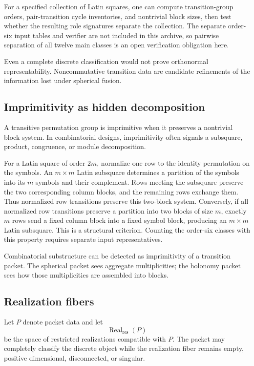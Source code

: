 \begin{skeletonbox}
For a specified collection of Latin squares, one can compute transition-group orders, pair-transition cycle inventories, and nontrivial block sizes, then test whether the resulting role signatures separate the collection.  The separate order-six input tables and verifier are not included in this archive, so pairwise separation of all twelve main classes is an open verification obligation here.
\end{skeletonbox}
Even a complete discrete classification would not prove orthonormal representability.  Noncommutative transition data are candidate refinements of the information lost under spherical fusion.

\subsection{Imprimitivity as hidden decomposition}
A transitive permutation group is imprimitive when it preserves a nontrivial block system.  In combinatorial designs, imprimitivity often signals a subsquare, product, congruence, or module decomposition.

For a Latin square of order $2m$, normalize one row to the identity permutation on the symbols.  An $m\times m$ Latin subsquare determines a partition of the symbols into its $m$ symbols and their complement.  Rows meeting the subsquare preserve the two corresponding column blocks, and the remaining rows exchange them.  Thus normalized row transitions preserve this two-block system.  Conversely, if all normalized row transitions preserve a partition into two blocks of size $m$, exactly $m$ rows send a fixed column block into a fixed symbol block, producing an $m\times m$ Latin subsquare.  This is a structural criterion.  Counting the order-six classes with this property requires separate input representatives.

\begin{principle}
Combinatorial substructure can be detected as imprimitivity of a transition packet.  The spherical packet sees aggregate multiplicities; the holonomy packet sees how those multiplicities are assembled into blocks.
\end{principle}

\subsection{Realization fibers}
Let $P$ denote packet data and let
\[
\operatorname{Real}_{\mathrm{res}}(P)
\]
be the space of restricted realizations compatible with $P$.  The packet may completely classify the discrete object while the realization fiber remains empty, positive dimensional, disconnected, or singular.

